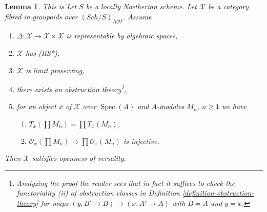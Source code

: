 \documentclass{stacks-project}
\newenvironment{reference}{\comment}{\endcomment}
\theoremstyle{plain}
\newtheorem{lemma}[subsection]{Lemma}
\theoremstyle{definition}
\theoremstyle{remark}
\numberwithin{equation}{subsection}
\def\Spec{\mathop{\mathrm{Spec}}}
\def\Sch{\mathit{Sch}}
\begin{document}
\begin{lemma}
\label{lemma-get-openness-obstruction-theory}
\begin{reference}
This is \cite[Theorem 4.4]{Hall-coherent}
\end{reference}
Let $S$ be a locally Noetherian scheme. Let $\mathcal{X}$ be a category fibred
in groupoids over $(\Sch/S)_{fppf}$. Assume
\begin{enumerate}
\item $\Delta : \mathcal{X} \to \mathcal{X} \times \mathcal{X}$ is
representable by algebraic spaces,
\item $\mathcal{X}$ has (RS*),
\item $\mathcal{X}$ is limit preserving,
\item there exists an obstruction theory\footnote{Analyzing the proof
the reader sees that in fact it suffices to check
the functoriality (ii) of obstruction classes in
Definition \ref{definition-obstruction-theory}
for maps $(y, B' \to B) \to (x, A' \to A)$
with $B = A$ and $y = x$.},
\item for an object $x$ of $\mathcal{X}$ over $\Spec(A)$
and $A$-modules $M_n$, $n \geq 1$ we have
\begin{enumerate}
\item $T_x(\prod M_n) = \prod T_x(M_n)$,
\item $\mathcal{O}_x(\prod M_n) \to \prod \mathcal{O}_x(M_n)$
is injective.
\end{enumerate}
\end{enumerate}
Then $\mathcal{X}$ satisfies openness of versality.
\end{lemma}
\end{document}

